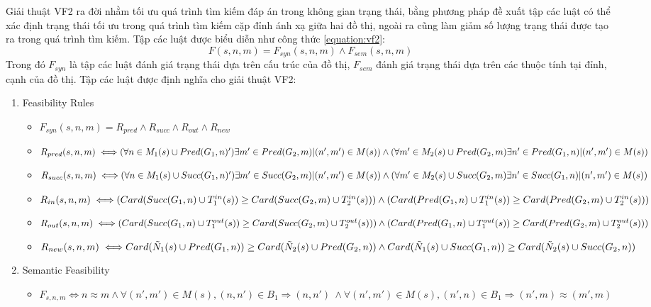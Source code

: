 \documentclass[12pt]{report}
\begin{document}
\noindent Giải thuật VF2 ra đời nhằm tối ưu quá trình tìm kiếm đáp án trong không gian trạng thái, bằng phương pháp đề xuất tập các luật có thể xác định trạng thái tối ưu trong quá trình tìm kiếm cặp đỉnh ánh xạ giữa hai đồ thị, ngoài ra cũng làm giảm số lượng trạng thái được tạo ra trong quá trình tìm kiếm. Tập các luật được biểu diễn như công thức \ref{equation:vf2}:
\indent \indent \indent \indent \indent
\begin{equation}
	F(s,n,m) = F_{syn}(s,n,m) \wedge F_{sem}(s,n,m)
	\label{equation:vf2}
\end{equation}
Trong đó $F_{syn}$ là tập các luật đánh giá trạng thái dựa trên cấu trúc của đồ thị, $F_{sem}$ đánh giá trạng thái dựa trên các thuộc tính tại đỉnh, cạnh của đồ thị.
\noindent Tập các luật được định nghĩa cho giải thuật VF2\cite{vf2_1368}:
\begin{enumerate}[label=\Roman*.]
	\vspace{-0.3cm}
	\item Feasibility Rules 
	\begin{itemize}
		\item $F_{syn}(s,n,m) = R_{pred} \wedge R_{succ} \wedge R_{out} \wedge R_{new}$
		\item $R_{pred}(s,n,m) \iff\\ (\forall n \in M_1(s) \cup Pred(G_1,n)') \exists m' \in Pred(G_2,m) | (n',m') \in M(s)) \wedge\\
		(\forall m' \in M_2(s) \cup Pred(G_2,m) \exists n' \in Pred(G_1,n) | (n',m') \in M(s))$
		\item $R_{succ}(s,n,m) \iff\\ (\forall n \in M_1(s) \cup Succ(G_1,n)') \exists m' \in Succ(G_2,m) | (n',m') \in M(s)) \wedge\\ 
		(\forall m' \in M_2(s) \cup Succ(G_2,m) \exists n' \in Succ(G_1,n) | (n',m') \in M(s))$
		\item $R_{in}(s,n,m) \iff\\ (Card(Succ(G_1,n) \cup T^{in}_1(s)) \geq  Card(Succ(G_2,m) \cup T^{in}_2(s))) \wedge\\
		(Card(Pred(G_1,n)\cup T^{in}_1(s)) \geq Card(Pred(G_2,m)\cup T^{in}_2(s)))$ 
		\item $R_{out}(s,n,m) \iff\\ (Card(Succ(G_1,n) \cup T^{out}_1(s)) \geq  Card(Succ(G_2,m) \cup T^{out}_2(s))) \wedge\\
		(Card(Pred(G_1,n)\cup T^{out}_1(s)) \geq Card(Pred(G_2,m)\cup T^{out}_2(s)))$ 
		\item $R_{new}(s,n,m) \iff\\ Card(\tilde{N}_1(s) \cup Pred(G_1,n)) \geq Card(\tilde{N}_2(s) \cup Pred(G_2,n)) \wedge\\
		Card(\tilde{N}_1(s) \cup Succ(G_1,n)) \geq Card(\tilde{N}_2(s) \cup Succ(G_2,n))$
	\end{itemize}
	\item Semantic Feasibility
	\begin{itemize}
		\item $F_{s,n,m} \iff n \approx m  \wedge \forall(n',m') \in M(s),(n,n') \in B_1 \Rightarrow (n,n')\
		 \wedge \forall(n',m') \in M(s),(n',n) \in B_1 \Rightarrow (n',m) \approx (m',m)$
	\end{itemize} 
\end{enumerate}
\end{document}
